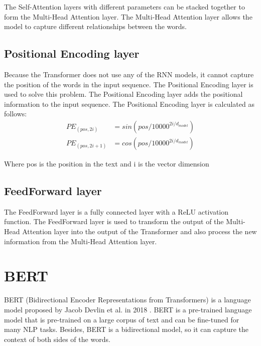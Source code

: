 The Self-Attention layers with different parameters can be stacked together to form the Multi-Head Attention layer. The Multi-Head Attention layer allows the model to capture different relationships between the words.

\subsection{Positional Encoding layer}
Because the Transformer does not use any of the RNN models, it cannot capture the position of the words in the input sequence. The Positional Encoding layer is used to solve this problem. The Positional Encoding layer adds the positional information to the input sequence. The Positional Encoding layer is calculated as follows:
\begin{align*}
    PE_{(pos, 2i)} &= sin(pos/10000^{2i/d_{model}}) \\
    PE_{(pos, 2i+1)} &= cos(pos/10000^{2i/d_{model}})
\end{align*}

\noindent Where pos is the position in the text and i is the vector dimension \cite{voita2020nlpCourse}

\subsection{FeedForward layer}
The FeedForward layer is a fully connected layer with a ReLU activation function. The FeedForward layer is used to transform the output of the Multi-Head Attention layer into the output of the Transformer and also process the new information from the Multi-Head Attention layer.

\section{BERT}
BERT (Bidirectional Encoder Representations from Transformers) is a language model proposed by Jacob Devlin et al. in 2018 \cite{bert_jacob}. BERT is a pre-trained language model that is pre-trained on a large corpus of text and can be fine-tuned for many NLP tasks. Besides, BERT is a bidirectional model, so it can capture the context of both sides of the words.


